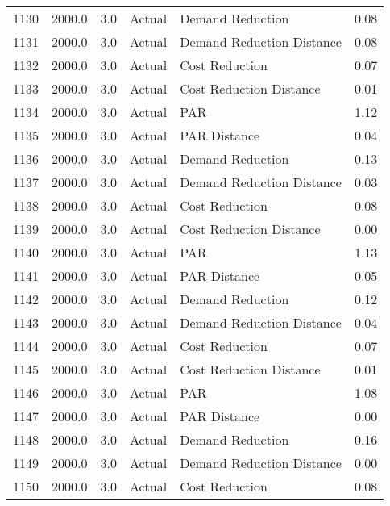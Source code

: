 \begin{longtable}{lrrllr}
1130 &       2000.0 &     3.0 &         Actual &           Demand Reduction &   0.08 \\
1131 &       2000.0 &     3.0 &         Actual &  Demand Reduction Distance &   0.08 \\
1132 &       2000.0 &     3.0 &         Actual &             Cost Reduction &   0.07 \\
1133 &       2000.0 &     3.0 &         Actual &    Cost Reduction Distance &   0.01 \\
1134 &       2000.0 &     3.0 &         Actual &                        PAR &   1.12 \\
1135 &       2000.0 &     3.0 &         Actual &               PAR Distance &   0.04 \\
1136 &       2000.0 &     3.0 &         Actual &           Demand Reduction &   0.13 \\
1137 &       2000.0 &     3.0 &         Actual &  Demand Reduction Distance &   0.03 \\
1138 &       2000.0 &     3.0 &         Actual &             Cost Reduction &   0.08 \\
1139 &       2000.0 &     3.0 &         Actual &    Cost Reduction Distance &   0.00 \\
1140 &       2000.0 &     3.0 &         Actual &                        PAR &   1.13 \\
1141 &       2000.0 &     3.0 &         Actual &               PAR Distance &   0.05 \\
1142 &       2000.0 &     3.0 &         Actual &           Demand Reduction &   0.12 \\
1143 &       2000.0 &     3.0 &         Actual &  Demand Reduction Distance &   0.04 \\
1144 &       2000.0 &     3.0 &         Actual &             Cost Reduction &   0.07 \\
1145 &       2000.0 &     3.0 &         Actual &    Cost Reduction Distance &   0.01 \\
1146 &       2000.0 &     3.0 &         Actual &                        PAR &   1.08 \\
1147 &       2000.0 &     3.0 &         Actual &               PAR Distance &   0.00 \\
1148 &       2000.0 &     3.0 &         Actual &           Demand Reduction &   0.16 \\
1149 &       2000.0 &     3.0 &         Actual &  Demand Reduction Distance &   0.00 \\
1150 &       2000.0 &     3.0 &         Actual &             Cost Reduction &   0.08 \\

\end{longtable}

